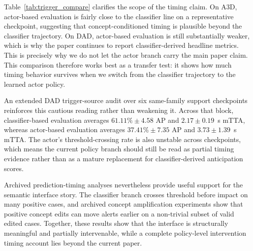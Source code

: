\begin{table}[t]
\caption{[Mechanism stress evidence] Matched score-source comparison on
representative checkpoints. The
same trained checkpoint is evaluated twice: once with the classifier score
trajectory and once with the actor policy score trajectory. These are support
analyses, not canonical headline results.}
\label{tab:trigger_compare}
\centering\footnotesize
\TableStyleOn
\setlength{\tabcolsep}{3pt}
\TableStyleOff
\end{table}

Table~\ref{tab:trigger_compare} clarifies the scope of the timing claim. On
A3D, actor-based evaluation is fairly close to the classifier line on a
representative checkpoint, suggesting that concept-conditioned timing is
plausible beyond the classifier trajectory. On DAD, actor-based evaluation is
still substantially weaker, which is why the paper continues to report
classifier-derived headline metrics. This is precisely why we do not let the
actor branch carry the main paper claim. This comparison therefore works best
as a transfer test: it shows how much timing behavior survives when we switch
from the classifier trajectory to the learned actor policy.

An extended DAD trigger-source audit over six same-family support checkpoints
reinforces this cautious reading rather than weakening it. Across that block,
classifier-based evaluation averages $61.11\%\pm4.58$ AP and
$2.17\pm0.19$~s mTTA, whereas actor-based evaluation averages
$37.41\%\pm7.35$ AP and $3.73\pm1.39$~s mTTA. The actor's threshold-crossing
rate is also unstable across checkpoints, which means the current policy
branch should still be read as partial timing evidence rather than as a mature
replacement for classifier-derived anticipation scores.

Archived prediction-timing analyses nevertheless provide useful support for the
semantic interface story. The classifier branch crosses threshold before impact
on many positive cases, and archived concept amplification experiments show that
positive concept edits can move alerts earlier on a non-trivial subset of
valid edited cases. Together, these results show that the interface is
structurally meaningful and partially intervenable, while a complete
policy-level intervention timing account lies beyond the current paper.

